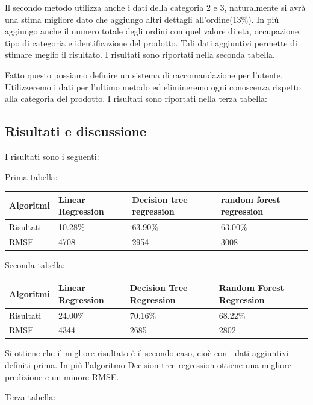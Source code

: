 \documentclass{article}
\begin{document}
Il secondo metodo utilizza anche i dati della categoria 2 e 3, naturalmente si avrà una stima migliore dato che aggiungo altri dettagli all'ordine(13\%). In più aggiungo anche il numero totale degli ordini con quel valore di eta, occupazione, tipo di categoria e identificazione del prodotto. Tali dati aggiuntivi permette di stimare meglio il risultato. I risultati sono riportati nella seconda tabella.


Fatto questo possiamo definire un sistema di raccomandazione per l'utente. Utilizzeremo i dati per l'ultimo metodo ed elimineremo ogni conoscenza rispetto alla categoria del prodotto. I risultati sono riportati nella terza tabella:



\subsection{Risultati e discussione}
I risultati sono i seguenti:

Prima tabella:

\begin{tabular}{|p{}|p{}|p{}|p{}|}
\hline
Algoritmi &Linear Regression          & Decision tree regression         &random forest regression      \\
\hline
Risultati & 10.28\%            & 63.90\%     & 63.00\%          \\
\hline
RMSE     & 4708     & 2954                & 3008           \\
\hline
\end{tabular}

Seconda tabella:

\begin{tabular}{|p{}|p{}|p{}|p{}|}
\hline
Algoritmi &Linear Regression          & Decision Tree Regression         &Random Forest Regression      \\
\hline
Risultati &24.00\%            & 70.16\%    & 68.22\%          \\
\hline
RMSE &4344 &2685 &2802\\
\hline
\end{tabular}

Si ottiene che il migliore risultato è il secondo caso, cioè con i dati aggiuntivi definiti  prima. In più l'algoritmo  Decision tree regression ottiene una migliore predizione e un minore RMSE.

Terza tabella: 
\end{document}
